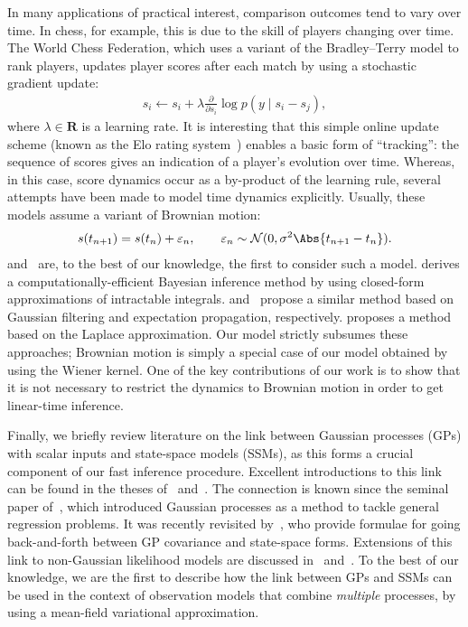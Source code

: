 In many applications of practical interest, comparison outcomes tend to vary over time.
In chess, for example, this is due to the skill of players changing over time.
The World Chess Federation, which uses a variant of the Bradley--Terry model to rank players, updates player scores after each match by using a stochastic gradient update:
\begin{align*}
s_i \gets s_i + \lambda \frac{\partial}{\partial s_i} \log p(y \mid s_i - s_j),
\end{align*}
where $\lambda \in \mathbf{R}$ is a learning rate.
It is interesting that this simple online update scheme (known as the Elo rating system~\citep{elo1978rating}) enables a basic form of ``tracking'': the sequence of scores gives an indication of a player's evolution over time.
Whereas, in this case, score dynamics occur as a by-product of the learning rule, several attempts have been made to model time dynamics explicitly.
Usually, these models assume a variant of Brownian motion:
\begin{align}
\label{kks:eq:brownian}
s(t_{n+1}) = s(t_n) + \varepsilon_{n},
    \qquad \varepsilon_{n} \sim \mathcal{N}(0, \sigma^2 \Abs{t_{n+1} - t_n}).
\end{align}
\citet{glickman1993paired} and~\citet{fahrmeir1994dynamic} are, to the best of our knowledge, the first to consider such a model.
\citet{glickman1999parameter} derives a computationally-efficient Bayesian inference method by using closed-form approximations of intractable integrals.
\citet{herbrich2006trueskill} and~\citet{dangauthier2007trueskill} propose a similar method based on Gaussian filtering and expectation propagation, respectively.
\citet{coulom2008whole} proposes a method based on the Laplace approximation.
Our model strictly subsumes these approaches; Brownian motion is simply a special case of our model obtained by using the Wiener kernel.
One of the key contributions of our work is to show that it is not necessary to restrict the dynamics to Brownian motion in order to get linear-time inference.

Finally, we briefly review literature on the link between Gaussian processes (GPs) with scalar inputs and state-space models (SSMs), as this forms a crucial component of our fast inference procedure.
Excellent introductions to this link can be found in the theses of~\citet{saatci2012scalable} and~\citet{solin2016stochastic}.
The connection is known since the seminal paper of~\citet{ohagan1978curve}, which introduced Gaussian processes as a method to tackle general regression problems.
It was recently revisited by~\citet{hartikainen2010kalman}, who provide formulae for going back-and-forth between GP covariance and state-space forms.
Extensions of this link to non-Gaussian likelihood models are discussed in~\citet{saatci2012scalable} and~\citet{nickisch2018state}.
To the best of our knowledge, we are the first to describe how the link between GPs and SSMs can be used in the context of observation models that combine \emph{multiple} processes, by using a mean-field variational approximation.
